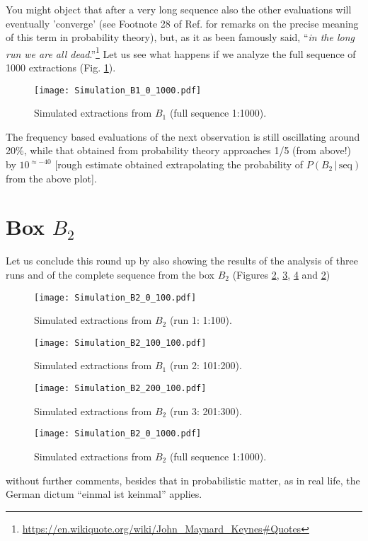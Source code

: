 \documentclass[11pt]{article}
\begin{document}
You might object that after a very long sequence 
also the other evaluations will eventually 'converge' 
(see Footnote 28 of Ref. \cite{ME2016} 
for remarks on the precise meaning of this
term in probability theory), but, as it as been famously said, 
``{\sl in the long run we are all 
dead}.''\footnote{\url{https://en.wikiquote.org/wiki/John_Maynard_Keynes#Quotes}} 
Let us see what happens if we 
analyze the full sequence of 1000 extractions 
(Fig. \ref{fig:Simulazione_B1_0_1000}). 
\begin{figure}
\centerline{\texttt{[image: Simulation\_B1\_0\_1000.pdf]}}
\caption{\small \sf Simulated extractions from $B_1$ (full sequence 1:1000).}
\label{fig:Simulazione_B1_0_1000}
\end{figure}
The frequency based evaluations of the next 
observation
is still oscillating around 20\%, while that obtained from 
probability theory approaches 1/5 (from above!)
by $10^{\approx -40}$ [rough estimate obtained extrapolating the probability
of $P(B_2\,|\,\mbox{seq})$ from the above plot]. 

\section{Box $B_2$}
Let us conclude this round up by also showing 
the results of the analysis of three
runs and of the complete sequence from the box $B_2$ 
(Figures \ref{fig:Simulazione_B2_0_100}, 
 \ref{fig:Simulazione_B2_100_100},  
\ref{fig:Simulazione_B2_200_100} and  \ref{fig:Simulazione_B2_0_100})
\begin{figure}
\centerline{\texttt{[image: Simulation\_B2\_0\_100.pdf]}}
\caption{\small \sf Simulated extractions from $B_2$ (run 1: 1:100).}
\label{fig:Simulazione_B2_0_100}
\end{figure}
\begin{figure}
\centerline{\texttt{[image: Simulation\_B2\_100\_100.pdf]}}
\caption{\small \sf Simulated extractions from $B_1$ (run 2: 101:200).}
\label{fig:Simulazione_B2_100_100}
\end{figure}
\begin{figure}
\centerline{\texttt{[image: Simulation\_B2\_200\_100.pdf]}}
\caption{\small \sf Simulated extractions from $B_2$ (run 3: 201:300).}
\label{fig:Simulazione_B2_200_100}
\end{figure}
\begin{figure}
\centerline{\texttt{[image: Simulation\_B2\_0\_1000.pdf]}}
\caption{\small \sf Simulated extractions from $B_2$ (full sequence 1:1000).}
\label{fig:Simulazione_B2_0_1000}
\end{figure}
without further comments, besides that in probabilistic
matter, as in real life, 
the German dictum ``einmal ist keinmal'' applies. 
\end{document}
